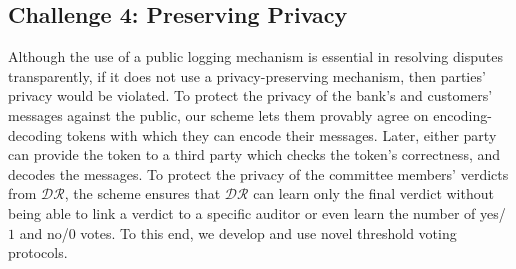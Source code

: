 \vspace{-4mm}
\subsection{Challenge 4: Preserving Privacy}
 Although the use of a public logging mechanism is essential in resolving disputes transparently, if it does not use a  privacy-preserving mechanism, then parties' privacy would be violated. To protect the privacy of the bank's and customers' messages against the public, our scheme lets them provably agree on encoding-decoding tokens with which they can encode their messages. Later, either party can provide the token to a third party which checks the token's correctness, and decodes the messages. To protect the privacy of the committee members' verdicts from $\mathcal{DR}$, the scheme ensures that  $\mathcal{DR}$ can learn only the final verdict without being able to link a verdict to a specific auditor or even learn the number of yes/$1$ and no/$0$ votes. To this end, we develop and use novel threshold voting protocols. 
 
 
 
 